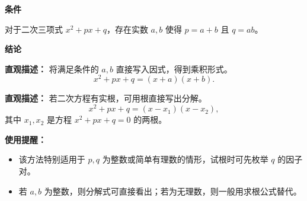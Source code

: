 \begin{statementbox}

	\textbf{\textcolor{CStatement}{条件}}
	\begin{description}[style=nextline, leftmargin=2.8em, labelsep=0.5em, itemsep=0.35em]
		\item[\textbf{\textcolor{CStatement}{条件1（十字分解）：}}] 对于二次三项式 $x^2+px+q$，存在实数 $a,b$ 使得 $p=a+b$ 且 $q=ab$。
	\end{description}

	\textbf{\textcolor{CStatement}{结论}}
	\begin{description}[style=nextline, leftmargin=2.8em, labelsep=0.5em, itemsep=0.45em]
		\item[\textbf{\textcolor{CStatement}{结论一（十字分解式）：}}]
			\textbf{\textcolor{CStatement}{直观描述：}}
			将满足条件的 $a,b$ 直接写入因式，得到乘积形式。
			\[
				x^2+px+q=(x+a)(x+b).
			\]

		\item[\textbf{\textcolor{CStatement}{常见变形（根式分解）：}}]
			\textbf{\textcolor{CStatement}{直观描述：}}
			若二次方程有实根，可用根直接写出分解。
			\[
				x^2+px+q=(x-x_1)(x-x_2),
			\]
			其中 $x_1,x_2$ 是方程 $x^2+px+q=0$ 的两根。
	\end{description}

	\medskip
	\textbf{\textcolor{CStatement}{使用提醒：}}
	\begin{itemize}[leftmargin=*, itemsep=0.2em, topsep=0.2em]
		\item 该方法特别适用于 $p,q$ 为整数或简单有理数的情形，试根时可先枚举 $q$ 的因子对。
		\item 若 $a,b$ 为整数，则分解式可直接看出；若为无理数，则一般用求根公式替代。
	\end{itemize}
\end{statementbox}
